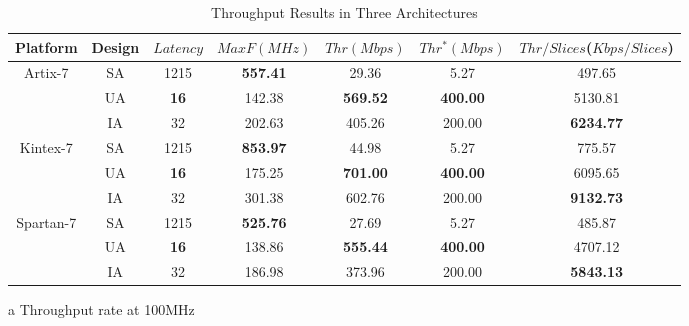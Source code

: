 \documentclass[final,5p,times,twocolumn]{elsarticle}
\begin{document}
\begin{table}
    \begin{threeparttable}
        \caption{Throughput Results in Three Architectures}\label{throughput_compare}%
        \begin{tabular*}{\textwidth}{@{\extracolsep\fill}|c|c|c|c|c|c|c|}
            \hline
            Platform & Design & $Latency$ & $MaxF(MHz)$ & $Thr(Mbps)$ & $Thr^*(Mbps)$\tnote{a} & $Thr/Slices$($Kbps/Slices$) \\
            \hline
            \multirow{3}{*}{Artix-7}  & SA & 1215 & \textbf{557.41} & 29.36 & 5.27 & 497.65 \\
            & UA & \textbf{16} & 142.38 & \textbf{569.52} & \textbf{400.00} & 5130.81 \\
            & IA & 32 & 202.63 & 405.26 & 200.00 & \textbf{6234.77} \\
            \hline
            \multirow{3}{*}{Kintex-7} & SA & 1215 & \textbf{853.97} & 44.98 & 5.27 & 775.57 \\
            & UA & \textbf{16} & 175.25 & \textbf{701.00} & \textbf{400.00} & 6095.65 \\
            & IA & 32 & 301.38 & 602.76 & 200.00 & \textbf{9132.73} \\
            \hline
            \multirow{3}{*}{Spartan-7} & SA & 1215 & \textbf{525.76} & 27.69 & 5.27 & 485.87 \\
            & UA & \textbf{16} & 138.86 & \textbf{555.44} & \textbf{400.00} & 4707.12 \\
            & IA & 32 & 186.98 & 373.96 & 200.00 & \textbf{5843.13} \\
            \hline
        \end{tabular*}
        \begin{tablenotes}
            \item[a] Throughput rate at 100MHz
        \end{tablenotes}
    \end{threeparttable}
\end{table}
\end{document}
